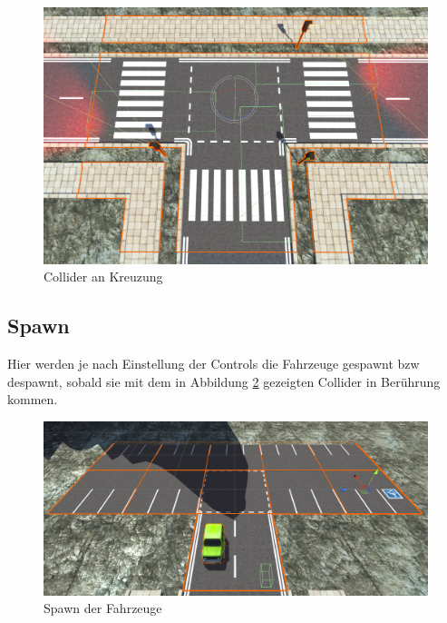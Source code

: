 \begin{figure}[H]
\begin{center}
	\includegraphics[width=1\textwidth]{BilderAllgemein/crossing_collider.PNG}
\end{center}
	\caption{Collider an Kreuzung}
	\label{img:crossing_collider}
\end{figure}

\subsection{Spawn}

Hier werden je nach Einstellung der Controls die Fahrzeuge gespawnt bzw despawnt, sobald sie mit dem in Abbildung \ref{img:spawn} gezeigten Collider in Berührung kommen.

\begin{figure}[H]
\begin{center}
	\includegraphics[width=1\textwidth]{BilderAllgemein/spawn.PNG}
\end{center}
	\caption{Spawn der Fahrzeuge}
	\label{img:spawn}
\end{figure}

